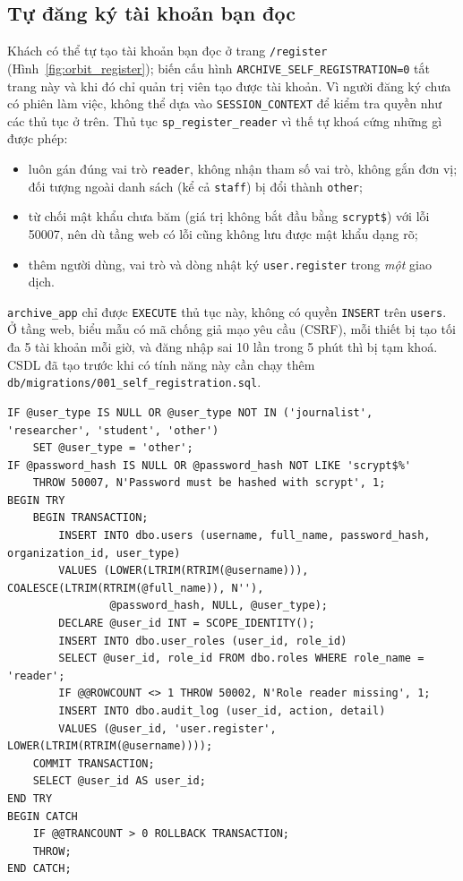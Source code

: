 \subsection{Tự đăng ký tài khoản bạn đọc}
\label{sec:register}

Khách có thể tự tạo tài khoản bạn đọc ở trang \texttt{/register}
(Hình~\ref{fig:orbit_register}); biến cấu hình \texttt{ARCHIVE\_SELF\_REGISTRATION=0} tắt
trang này và khi đó chỉ quản trị viên tạo được tài khoản. Vì người đăng ký chưa có phiên làm
việc, không thể dựa vào \texttt{SESSION\_CONTEXT} để kiểm tra quyền như các thủ tục ở trên.
Thủ tục \texttt{sp\_register\_reader} vì thế tự khoá cứng những gì được phép:
\begin{itemize}
    \item luôn gán đúng vai trò \texttt{reader}, không nhận tham số vai trò, không gắn đơn vị;
    đối tượng ngoài danh sách (kể cả \texttt{staff}) bị đổi thành \texttt{other};
    \item từ chối mật khẩu chưa băm (giá trị không bắt đầu bằng \texttt{scrypt\$}) với lỗi
    50007, nên dù tầng web có lỗi cũng không lưu được mật khẩu dạng rõ;
    \item thêm người dùng, vai trò và dòng nhật ký \texttt{user.register} trong \textit{một}
    giao dịch.
\end{itemize}
\texttt{archive\_app} chỉ được \texttt{EXECUTE} thủ tục này, không có quyền \texttt{INSERT} trên
\texttt{users}. Ở tầng web, biểu mẫu có mã chống giả mạo yêu cầu (CSRF), mỗi thiết bị tạo tối
đa 5 tài khoản mỗi giờ, và đăng nhập sai 10 lần trong 5 phút thì bị tạm khoá. CSDL đã tạo
trước khi có tính năng này cần chạy thêm \texttt{db/migrations/001\_self\_registration.sql}.

\begin{lstlisting}[caption={Phần lõi của sp\_register\_reader}, label={lst:register}]
IF @user_type IS NULL OR @user_type NOT IN ('journalist', 'researcher', 'student', 'other')
    SET @user_type = 'other';
IF @password_hash IS NULL OR @password_hash NOT LIKE 'scrypt$%'
    THROW 50007, N'Password must be hashed with scrypt', 1;
BEGIN TRY
    BEGIN TRANSACTION;
        INSERT INTO dbo.users (username, full_name, password_hash, organization_id, user_type)
        VALUES (LOWER(LTRIM(RTRIM(@username))), COALESCE(LTRIM(RTRIM(@full_name)), N''),
                @password_hash, NULL, @user_type);
        DECLARE @user_id INT = SCOPE_IDENTITY();
        INSERT INTO dbo.user_roles (user_id, role_id)
        SELECT @user_id, role_id FROM dbo.roles WHERE role_name = 'reader';
        IF @@ROWCOUNT <> 1 THROW 50002, N'Role reader missing', 1;
        INSERT INTO dbo.audit_log (user_id, action, detail)
        VALUES (@user_id, 'user.register', LOWER(LTRIM(RTRIM(@username))));
    COMMIT TRANSACTION;
    SELECT @user_id AS user_id;
END TRY
BEGIN CATCH
    IF @@TRANCOUNT > 0 ROLLBACK TRANSACTION;
    THROW;
END CATCH;
\end{lstlisting}

